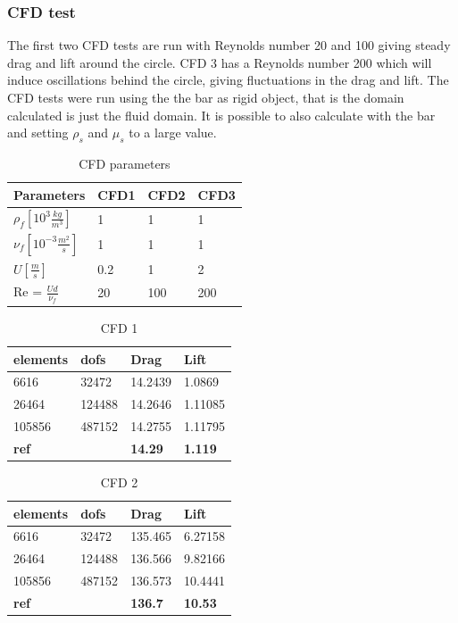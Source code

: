 \subsubsection{CFD test}
The first two CFD tests are run with Reynolds number 20 and 100 giving steady drag and lift around the circle. CFD 3 has a Reynolds number 200 which will induce oscillations behind the circle, giving fluctuations in the drag and lift.
The CFD tests were run using the the bar as rigid object, that is the domain calculated is just the fluid domain. It is possible to also calculate with the bar and setting $\rho_s$ and $\mu_s$ to a large value. 

\begin{table}[h!]
\centering
\caption{CFD parameters}
\label{my-label}
\begin{tabular}{|l|l|l|l|}
\hline
Parameters & CFD1 & CFD2 & CFD3 \\ \hline
$\rho_f [10^3 \frac{kg}{m^3}]$ & 1 & 1 & 1 \\ \hline
$\nu_f [10^{-3} \frac{m^2}{s}]$ & 1 & 1 & 1 \\ \hline
$ U [\frac{m}{s}] $ & 0.2 & 1 & 2 \\ \hline
Re = $\frac{Ud}{\nu_f}$ & 20 & 100 & 200 \\ \hline
\end{tabular}
\end{table}

\begin{table}[h!]
\centering
\caption{CFD 1}
\label{my-label}
\begin{tabular}{|l|l|l|l|}
\hline
\textbf{elements} & \textbf{dofs} & \textbf{Drag} & \textbf{Lift} \\ \hline
6616 & 32472 & 14.2439 & 1.0869 \\ \hline
26464 & 124488 & 14.2646 & 1.11085 \\ \hline
105856 & 487152 & 14.2755 & 1.11795 \\ \hline
\textbf{ref} & \textbf{} & \textbf{14.29} & \textbf{1.119} \\ \hline
\end{tabular}
\end{table}

\begin{table}[h!]
\centering
\caption{CFD 2}
\label{my-label}
\begin{tabular}{|l|l|l|l|}
\hline
\textbf{elements} & \textbf{dofs} & \textbf{Drag} & \textbf{Lift} \\ \hline
6616 & 32472 & 135.465 & 6.27158 \\ \hline
26464 & 124488 & 136.566 & 9.82166 \\ \hline
105856 & 487152 & 136.573 & 10.4441 \\ \hline
\textbf{ref} & \textbf{} & \textbf{136.7} & \textbf{10.53} \\ \hline
\end{tabular}
\end{table}

